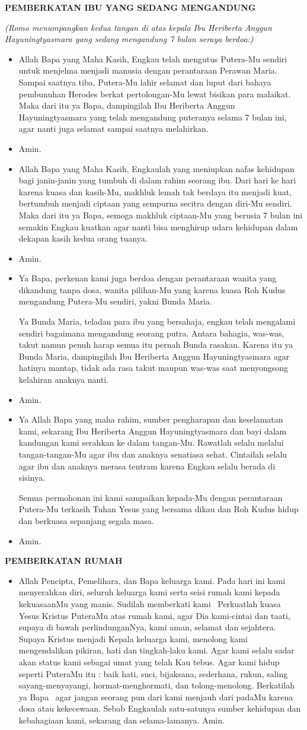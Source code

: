 \documentclass[12pt,twoside]{book}
\makeatletter
\newcommand{\judul}[1]{%
  {\parindent \z@ \centering \normalfont
    \interlinepenalty\@M \large \bfseries #1\par\nobreak \vskip 20\p@ }}
\newcommand{\BU}[1]{\begin{itemize} \item[U:] #1 \end{itemize}}
\newcommand{\BI}[1]{\begin{itemize} \item[I:] #1 \end{itemize}}
\newcommand{\calonibu}{Heriberta Anggun Hayuningtyasmara\xspace}
\makeatother
\begin{document}
\judul{PEMBERKATAN IBU YANG SEDANG MENGANDUNG}
{\itshape (Romo menumpangkan kedua tangan di atas kepala Ibu \calonibu yang sedang mengandung 7 bulan seraya berdoa:)}
\BI{Allah Bapa yang Maha Kasih, Engkau telah mengutus Putera-Mu sendiri untuk menjelma menjadi manusia dengan perantaraan Perawan Maria. Sampai saatnya tiba, Putera-Mu lahir selamat dan luput dari bahaya pembunuhan Herodes berkat pertolongan-Mu lewat bisikan para malaikat. Maka dari itu ya Bapa, dampingilah Ibu \calonibu yang telah mengandung puteranya selama 7 bulan ini, agar nanti juga selamat sampai saatnya melahirkan.}
\BU{Amin.}
\BI{Allah Bapa yang Maha Kasih, Engkaulah yang meniupkan nafas kehidupan bagi janin-janin yang tumbuh di dalam rahim seorang ibu. Dari hari ke hari karena kuasa dan kasih-Mu, makhluk lemah tak berdaya itu menjadi kuat, bertumbuh menjadi ciptaan yang sempurna secitra dengan diri-Mu sendiri. Maka dari itu ya Bapa, semoga makhluk ciptaan-Mu yang berusia 7 bulan ini semakin Engkau kuatkan agar nanti bisa menghirup udara kehidupan dalam dekapan kasih kedua orang tuanya.}
\BU{Amin.}
\BI{Ya Bapa, perkenan kami juga berdoa dengan perantaraan wanita yang dikandung tanpa dosa, wanita pilihan-Mu yang karena kuasa Roh Kudus mengandung Putera-Mu sendiri, yakni Bunda Maria.

Ya Bunda Maria, teladan para ibu yang bersahaja, engkau telah mengalami sendiri bagaimana mengandung seorang putra. Antara bahagia, was-was, takut namun penuh harap semua itu pernah Bunda rasakan. Karena itu ya Bunda Maria, dampingilah Ibu \calonibu agar hatinya mantap, tidak ada rasa takut maupun was-was saat menyongsong kelahiran anaknya nanti.} 
\BU{Amin.}

\BI{Ya Allah Bapa yang maha rahim, sumber pengharapan dan keselamatan kami, sekarang Ibu \calonibu dan bayi dalam kandungan kami serahkan ke dalam tangan-Mu. Rawatlah selalu melalui tangan-tangan-Mu agar ibu dan anaknya senatiasa sehat. Cintailah selalu agar ibu dan anaknya merasa tentram karena Engkau selalu berada di sisinya. 

Semua permohonan ini kami sampaikan kepada-Mu dengan perantaraan Putera-Mu terkasih Tuhan Yesus yang bersama dikau dan Roh Kudus hidup dan berkuasa sepanjang segala masa.}
\BU{Amin.}


\judul{PEMBERKATAN RUMAH}

\BI{Allah Pencipta, Pemelihara, dan Bapa keluarga kami. Pada hari ini kami menyerahkan diri, seluruh keluarga kami serta seisi rumah kami kepada kekuasaanMu yang manis. Sudilah memberkati kami \Cross ~Perkuatlah kuasa Yesus Kristus PuteraMu atas rumah kami, agar Dia kami-cintai dan taati, supaya di bawah perlindunganNya, kami aman, selamat dan sejahtera. Supaya Kristus menjadi Kepala keluarga kami, menolong kami mengendalikan pikiran, hati dan tingkah-laku kami. Agar kami selalu sadar akan status kami sebagai umat yang telah Kau tebus. Agar kami hidup seperti PuteraMu itu : baik hati, suci, bijaksana, sederhana, rukun, saling sayang-menyayangi, hormat-menghormati, dan tolong-menolong. Berkatilah ya Bapa \Cross ~agar jangan seorang pun dari kami menjauh dari padaMu karena dosa atau kekecewaan. Sebab Engkaulah satu-satunya sumber kehidupan dan kebahagiaan kami, sekarang dan selama-lamanya.
Amin.}
\end{document}
